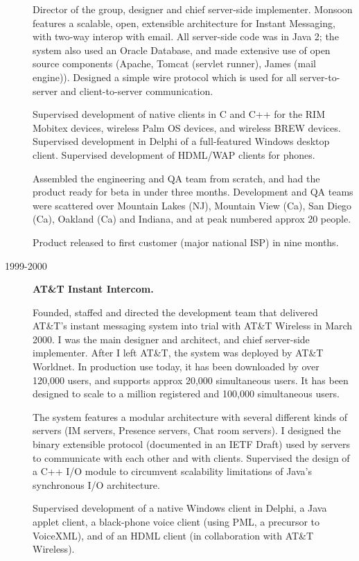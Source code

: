 \documentclass{article}
\begin{document}
\begin{description}
Director of the group, designer and chief server-side implementer.
  Monsoon features a scalable, open, extensible architecture for
  Instant Messaging, with two-way interop with email. All server-side
  code was in Java 2; the system also used an Oracle Database, and
  made extensive use of open source components (Apache, Tomcat
  (servlet runner), James (mail engine)). Designed a simple wire
  protocol which is used for all server-to-server and client-to-server
  communication.

  Supervised development of native clients in C and C++ for the RIM
  Mobitex devices, wireless Palm OS devices, and wireless BREW
  devices.  Supervised development in Delphi of a full-featured
  Windows desktop client. Supervised development of HDML/WAP clients
  for phones.

  Assembled the engineering and QA team from scratch, and had the
  product ready for beta in under three months.  Development and QA
  teams were scattered over Mountain Lakes (NJ), Mountain View (Ca),
  San Diego (Ca), Oakland (Ca) and Indiana, and at peak numbered
  approx 20 people.

  Product released to first customer (major national ISP) in nine
  months.

\item[1999-2000] \textbf{AT\&T Instant Intercom.} 

  Founded, staffed and directed the development team that delivered
  AT\&T's instant messaging system into trial with AT\&T Wireless in
  March 2000. I was the main designer and architect, and chief
  server-side implementer. After I left AT\&T, the system was deployed
  by AT\&T Worldnet. In production use today, it has been downloaded
  by over 120,000 users, and supports approx 20,000 simultaneous
  users. It has been designed to scale to a million registered and
  100,000 simultaneous users.

  The system features a modular architecture with several different
  kinds of servers (IM servers, Presence servers, Chat room
  servers). I designed the binary extensible protocol (documented in
  an IETF Draft) used by servers to communicate with each other and
  with clients. Supervised the design of a C++ I/O module to
  circumvent scalability limitations of Java's synchronous I/O
  architecture.

  Supervised development of a native Windows client in Delphi, a Java
  applet client, a black-phone voice client (using PML, a precursor to
  VoiceXML), and of an HDML client (in collaboration with
  AT\&T Wireless).


\end{description}
\end{document}
